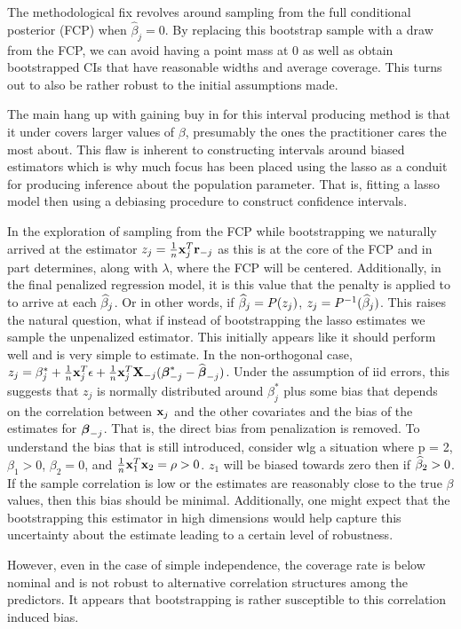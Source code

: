 The methodological fix revolves around sampling from the full conditional posterior (FCP) when $\hat{\beta}_j = 0$. By replacing this bootstrap sample with a draw from the FCP, we can avoid having a point mass at 0 as well as obtain bootstrapped CIs that have reasonable widths and average coverage. This turns out to also be rather robust to the initial assumptions made.

The main hang up with gaining buy in for this interval producing method is that it under covers larger values of $\beta$, presumably the ones the practitioner cares the most about. This flaw is inherent to constructing intervals around biased estimators which is why much focus has been placed using the lasso as a conduit for producing inference about the population parameter. That is, fitting a lasso model then using a debiasing procedure to construct confidence intervals.

In the exploration of sampling from the FCP while bootstrapping we naturally arrived at the estimator $z_j = \frac{1}{n}\mathbf{x}_j^T\mathbf{r}_{-j}$ as this is at the core of the FCP and in part determines, along with $\lambda$, where the FCP will be centered. Additionally, in the final penalized regression model, it is this value that the penalty is applied to to arrive at each $\widehat{\beta}_j$. Or in other words, if $\widehat{\beta}_j = P(z_j)$,  $z_j = P^{-1}(\widehat{\beta}_j)$. This raises the natural question, what if instead of bootstrapping the lasso estimates we sample the unpenalized estimator. This initially appears like it should perform well and is very simple to estimate. In the non-orthogonal case, $z_j = \beta^*_j + \frac{1}{n}\mathbf{x}_j^T \epsilon + \frac{1}{n}\mathbf{x}_j^T \mathbf{X}_{-j}(\boldsymbol{\beta}^*_{-j} - \widehat{\boldsymbol{\beta}}_{-j})$. Under the assumption of iid errors, this suggests that $z_j$ is normally distributed around $\beta^*_j$ plus some bias that depends on the correlation between $\mathbf{x}_j$ and the other covariates and the bias of the estimates for $\boldsymbol{\beta}_{-j}$. That is, the direct bias from penalization is removed. To understand the bias that is still introduced, consider wlg a situation where p = 2, $\beta_1 > 0$, $\beta_2 = 0$, and $\frac{1}{n}\mathbf{x}_1^T\mathbf{x}_2 = \rho > 0$. $z_1$ will be biased towards zero then if $\widehat{\beta}_2 > 0$. If the sample correlation is low or the estimates are reasonably close to the true $\beta$ values, then this bias should be minimal. Additionally, one might expect that the bootstrapping this estimator in high dimensions would help capture this uncertainty about the estimate leading to a certain level of robustness.

However, even in the case of simple independence, the coverage rate is below nominal and is not robust to alternative correlation structures among the predictors. It appears that bootstrapping is rather susceptible to this correlation induced bias. 

